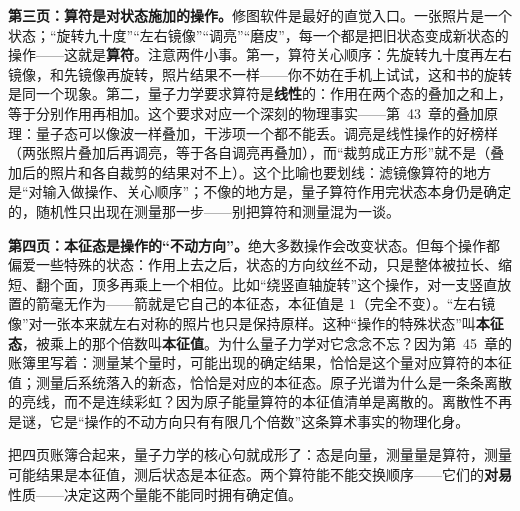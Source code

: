 \begin{center}
\end{center}

\textbf{第三页：算符是对状态施加的操作。}修图软件是最好的直觉入口。一张照片是一个状态；“旋转九十度”“左右镜像”“调亮”“磨皮”，每一个都是把旧状态变成新状态的操作——这就是\textbf{算符}。注意两件小事。第一，算符关心顺序：先旋转九十度再左右镜像，和先镜像再旋转，照片结果不一样——你不妨在手机上试试，这和书的旋转是同一个现象。第二，量子力学要求算符是\textbf{线性}的：作用在两个态的叠加之和上，等于分别作用再相加。这个要求对应一个深刻的物理事实——第~43~章的叠加原理：量子态可以像波一样叠加，干涉项一个都不能丢。调亮是线性操作的好榜样（两张照片叠加后再调亮，等于各自调亮再叠加），而“裁剪成正方形”就不是（叠加后的照片和各自裁剪的结果对不上）。这个比喻也要划线：滤镜像算符的地方是“对输入做操作、关心顺序”；不像的地方是，量子算符作用完状态本身仍是确定的，随机性只出现在测量那一步——别把算符和测量混为一谈。

\textbf{第四页：本征态是操作的“不动方向”。}绝大多数操作会改变状态。但每个操作都偏爱一些特殊的状态：作用上去之后，状态的方向纹丝不动，只是整体被拉长、缩短、翻个面，顶多再乘上一个相位。比如“绕竖直轴旋转”这个操作，对一支竖直放置的箭毫无作为——箭就是它自己的本征态，本征值是 $1$（完全不变）。“左右镜像”对一张本来就左右对称的照片也只是保持原样。这种“操作的特殊状态”叫\textbf{本征态}，被乘上的那个倍数叫\textbf{本征值}。为什么量子力学对它念念不忘？因为第~45~章的账簿里写着：测量某个量时，可能出现的确定结果，恰恰是这个量对应算符的本征值；测量后系统落入的新态，恰恰是对应的本征态。原子光谱为什么是一条条离散的亮线，而不是连续彩虹？因为原子能量算符的本征值清单是离散的。离散性不再是谜，它是“操作的不动方向只有有限几个倍数”这条算术事实的物理化身。

把四页账簿合起来，量子力学的核心句就成形了：态是向量，测量量是算符，测量可能结果是本征值，测后状态是本征态。两个算符能不能交换顺序——它们的\textbf{对易}性质——决定这两个量能不能同时拥有确定值。

